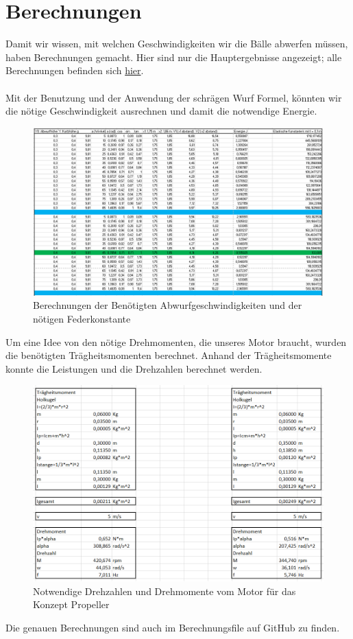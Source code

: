 \section{Berechnungen}
Damit wir wissen, mit welchen Geschwindigkeiten wir die Bälle abwerfen müssen, haben Berechnungen gemacht.
Hier sind nur die Hauptergebnisse angezeigt; alle Berechnungen befinden sich \href{https://github.com/accefa/doku/tree/master/bin/Berechnungen.xlsx}{hier}. \\ \\
Mit der Benutzung und der Anwendung der schrägen Wurf Formel, könnten wir die nötige Geschwindigkeit ausrechnen und damit die notwendige Energie.
\begin{figure}[h!]
	\centering
	\includegraphics[width=1\textwidth]{../../fig/Geschwindigkeit_und_eleastische_Konstante.png}
	\caption{Berechnungen der Benötigten Abwurfgeschwindigkeiten und der nötigen Federkonstante}
	\label{fig:Berechnungen von die Geschwindigkeit}
\end{figure}
\newpage
Um eine Idee von den nötige Drehmomenten, die unseres Motor braucht, wurden die benötigten Trägheitsmomenten berechnet. Anhand der Trägheitsmomente konnte die Leistungen und die Drehzahlen berechnet werden.
\begin{figure}[h!]
	\centering
	\includegraphics[width=1\textwidth]{../../fig/Berechnungen_Propeller.png}
	\caption{Notwendige Drehzahlen und Drehmomente vom Motor für das Konzept Propeller}
	\label{fig:Berechnungen für der Propellerkonzept}
\end{figure}

Die genauen Berechnungen sind auch im Berechnungsfile auf GitHub zu finden. 
